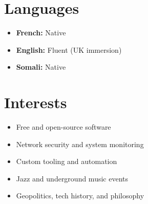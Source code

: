 \documentclass[11pt,a4paper]{article}
\begin{document}
\section*{Languages}
\begin{itemize}[leftmargin=*]
  \item \textbf{French:} Native
  \item \textbf{English:} Fluent (UK immersion)
  \item \textbf{Somali:} Native
\end{itemize}

\section*{Interests}
\begin{itemize}[leftmargin=*]
  \item Free and open-source software
  \item Network security and system monitoring
  \item Custom tooling and automation
  \item Jazz and underground music events
  \item Geopolitics, tech history, and philosophy
\end{itemize}
\end{document}
